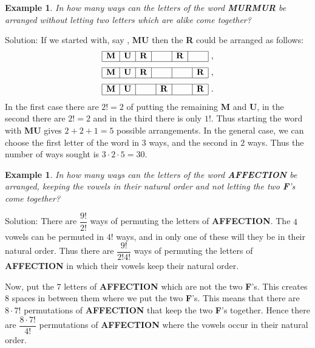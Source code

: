 \documentclass[11pt, openany]{book}
\theoremstyle{change} \theoremheaderfont{\blue\sffamily\bfseries}
\newtheorem{exa}[thm]{Example}
\theoremstyle{nonumberplain} \theoremheaderfont{\sffamily\bfseries}
\newcommand{\í}{\'{\i}}
\begin{document}
\begin{exa}
In how many ways can the letters of the word {\bf MURMUR} be
arranged without letting two letters which are alike come together?
\end{exa}
Solution: If we started with, say , {\bf MU} then the {\bf R} could
be arranged as follows:
$$\begin{array}{|c|c|c|c|c|c|}\hline {\bf M} & {\bf U} & {\bf R} & \hspace{.5cm}  & {\bf R} & \hspace{.5cm}    \\ \hline \end{array}\ ,  $$
$$\begin{array}{|c|c|c|c|c|c|}\hline {\bf M} & {\bf U} & {\bf R} & \hspace{.5cm}  & \hspace{.5cm} & {\bf R}    \\ \hline \end{array}\ ,  $$
$$\begin{array}{|c|c|c|c|c|c|}\hline {\bf M} & {\bf U} & \hspace{.5cm} & {\bf R}  & \hspace{.5cm} & {\bf R}    \\ \hline \end{array}\ .  $$
In the first case there are $2! = 2$ of putting the remaining {\bf
M} and {\bf U}, in the second there are $2!=2$ and in the third
there is only $1!$. Thus starting the word with {\bf MU} gives $2 +
2 + 1 = 5$ possible arrangements. In the general case, we can choose
the first letter of the word in $3$ ways, and the second in $2$
ways. Thus the number of ways sought is $3\cdot 2 \cdot 5 = 30$.
\begin{exa}
In how many ways can the letters of the word {\bf AFFECTION} be
arranged, keeping the vowels in their natural order and not letting
the two {\bf F}'s come together?
\end{exa}
Solution: There are $\dfrac{9!}{2!}$ ways of permuting the letters
of {\bf AFFECTION}. The $4$ vowels can be permuted in  $4!$ ways,
and in only one of these will they be in their natural order. Thus
there are $\dfrac{9!}{2!4!}$ ways of permuting the letters of {\bf
AFFECTION} in which their vowels keep their natural order.

\bigskip

Now, put the $7$ letters of {\bf AFFECTION} which are not the two
{\bf F}'s. This creates $8$ spaces in between them where we put the
two {\bf F}'s. This means that there are $8\cdot 7!$ permutations of
{\bf AFFECTION} that keep the two {\bf F}'s together. Hence there
are $\dfrac{8\cdot 7!}{4!}$ permutations of {\bf AFFECTION} where
the vowels occur in their natural order.
\end{document}
